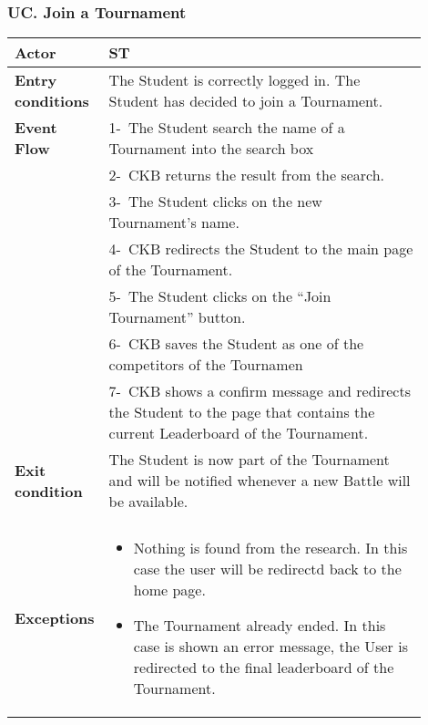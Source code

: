 \subsubsection*{UC\cuc . Join a Tournament}
\begin{center}
    \begin{longtable}{|l|p{0.9\linewidth}|}
        \hline
        \textbf{Actor}            & ST                                                                                                                                                                                        \\
        \hline
        \textbf{Entry conditions} & The Student is correctly logged in. The Student has decided to join a Tournament.                                                                                                                   \\
        \hline
        \textbf{Event Flow}       & 1-\ The Student search the name of a Tournament into the search box \\
        & 2-\ CKB returns the result from the search. \\
        & 3-\ The Student clicks on the new Tournament’s name.        \\
        & 4-\ CKB redirects the Student to the main page of the Tournament. \\
        & 5-\ The Student clicks on the “Join Tournament” button. \\
        & 6-\ CKB saves the Student as one of the competitors of the Tournamen \\
        & 7-\ CKB shows a confirm message and redirects the Student to the page that contains the current Leaderboard of the Tournament. \\
        \hline
        \textbf{Exit condition}   & The Student is now part of the Tournament and will be notified whenever a new Battle will be available.        \\                                                                                                                                                                                \\
        \hline
        \textbf{Exceptions}        & \begin{itemize}
            \item Nothing is found from the research. In this case the user will be redirectd back to the home page.
            \item The Tournament already ended. In this case is shown an error message, the User is redirected to the final leaderboard of the Tournament.

\end{itemize}
\end{longtable}
\end{center}
